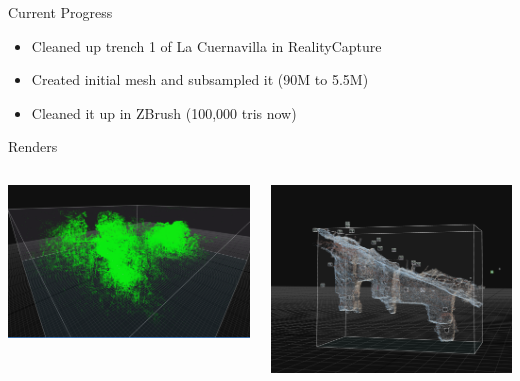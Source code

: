 \begin{frame}{Current Progress}
    \begin{itemize}
        \item Cleaned up trench 1 of La Cuernavilla in RealityCapture
        \item Created initial mesh and subsampled it (90M to 5.5M)
        \item Cleaned it up in ZBrush (100,000 tris now)
    \end{itemize}    
\end{frame}

\begin{frame}{Renders}
    \begin{columns}[T] %
        \begin{column}{0.5\textwidth}
            \includegraphics[width=\textwidth, keepaspectratio]{images/maya/image1.png}
        \end{column}
        \begin{column}{0.5\textwidth}
            \includegraphics[width=\textwidth, keepaspectratio]{images/maya/image2.png}
        \end{column}
    \end{columns}
\end{frame}

